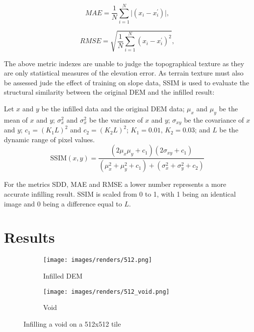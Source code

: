 \documentclass[twocolumn]{article}
\begin{document}
\begin{equation}
MAE = \frac{1}{N} \sum^N_{i=1} \vert(x_i - x^\prime_i )\vert,
\end{equation}

\begin{equation}
RMSE = \sqrt{\frac{1}{N} \sum^N_{i=1} (x_i - x^\prime_i)^2},
\end{equation}

The above metric indexes are unable to judge the topographical texture as they are only statistical measures of the elevation error.
As terrain texture must also be assessed jude the effect of training on slope data, SSIM is used to evaluate the structural similarity between the original DEM and the infilled result:

Let \(x\) and \(y\) be the infilled data and the original DEM data; \(\mu_x\) and \(\mu_y\) be the mean of \(x\) and \(y\); \(\sigma^2_x\) and \(\sigma^2_x\) be the variance of \(x\) and \(y\); \(\sigma_{xy}\) be the covariance of \(x\) and \(y\); \(c_1 = (K_1L)^2\) and \(c_2 = (K_2L)^2\); \(K_1 = 0.01\), \(K_2 = 0.03\); and \(L\) be the dynamic range of pixel values.
\begin{equation}
\text{SSIM}(x,y) = \frac{(2\mu_x\mu_y + c_1)(2 \sigma_{xy} + c_1)}{(\mu^2_x + \mu^2_y + c_1) + (\sigma_x^2 + \sigma^2_y + c_2)}
\end{equation}

For the metrics SDD, MAE and RMSE a lower number represents a more accurate infilling result.
SSIM is scaled from 0 to 1, with 1 being an identical image and 0 being a difference equal to \(L\).



\section{Results}
\label{sec:org612174c}

\begin{figure*}[p]
\begin{subfigure}{1\columnwidth}
  \caption{Infilled DEM}
  \texttt{[image: images/renders/512.png]}
  \label{fig:512}
\end{subfigure}
\hfill
\begin{subfigure}{1\columnwidth}
  \caption{Void}
  \texttt{[image: images/renders/512\_void.png]}
  \label{fig:512_void}
\end{subfigure}
\caption{Infilling a void on a 512x512 tile}
\label{fig:512_figure}
\end{figure*}
\end{document}
